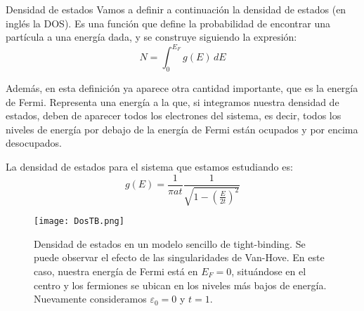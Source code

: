 \documentclass{beamer}
\begin{document}
\begin{frame}
    \begin{block}{Densidad de estados}
        Vamos a definir a continuación la densidad de estados (en inglés la DOS). Es una función que define la probabilidad de encontrar una partícula a una energía dada, y se construye siguiendo la expresión:
        \begin{equation}
            N = \int_0^{E_F} g(E) \, dE
        \end{equation}
    \end{block}
    Además, en esta definición ya aparece otra cantidad importante, que es la energía de Fermi. Representa una energía a la que, si integramos nuestra densidad de estados, deben de aparecer todos los electrones del sistema, es decir, todos los niveles de energía por debajo de la energía de Fermi están ocupados y por encima desocupados.

    La densidad de estados para el sistema que estamos estudiando es:
    \begin{equation}
        g(E) = \frac{1}{\pi at}\frac{1}{\sqrt{1-\left(\frac{E}{2t}\right)^2}}
    \end{equation}
\end{frame}
\begin{frame}
    \begin{figure}[h!]
        \begin{center}
            \texttt{[image: DosTB.png]}
            \caption{Densidad de estados en un modelo sencillo de tight-binding. Se puede observar el efecto de las singularidades de Van-Hove. En este caso, nuestra energía de Fermi está en $E_F = 0$, situándose en el centro y los fermiones se ubican en los niveles más bajos de energía. Nuevamente consideramos $\varepsilon_0 = 0$ y $t = 1$.}
            \label{fig:dosTB}
        \end{center}
    \end{figure}
\end{frame}
\end{document}
